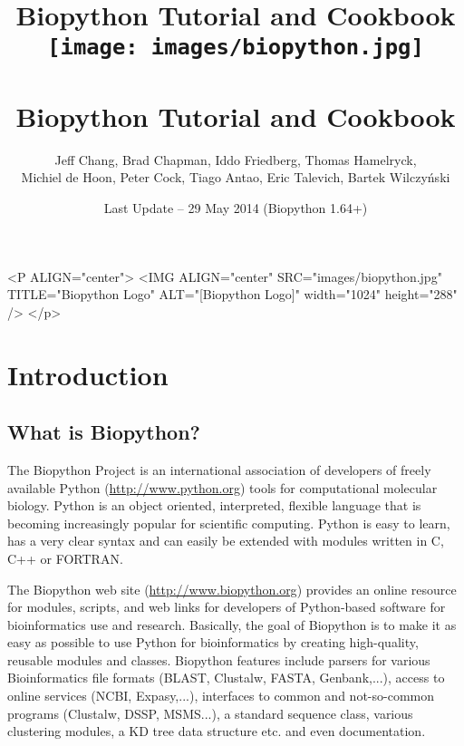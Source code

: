 \documentclass{report}
\begin{document}
\begin{htmlonly}
\title{Biopython Tutorial and Cookbook}
\end{htmlonly}
\begin{latexonly}
\title{
\texttt{[image: images/biopython.jpg]}\\
~\\
Biopython Tutorial and Cookbook}
\end{latexonly}

\author{Jeff Chang, Brad Chapman, Iddo Friedberg, Thomas Hamelryck, \\
Michiel de Hoon, Peter Cock, Tiago Antao, Eric Talevich, Bartek Wilczy\'{n}ski}
\date{Last Update -- 29 May 2014 (Biopython 1.64+)}

\begin{rawhtml}
<P ALIGN="center">
<IMG ALIGN="center" SRC="images/biopython.jpg" TITLE="Biopython Logo" ALT="[Biopython Logo]" width="1024" height="288" />
</p>
\end{rawhtml}

\maketitle
\tableofcontents

\chapter{Introduction}
\label{chapter:introduction}

\section{What is Biopython?}

The Biopython Project is an international association of developers of freely available Python (\url{http://www.python.org}) tools for computational molecular biology. Python is an object oriented, interpreted, flexible language that is becoming increasingly popular for scientific computing. Python is easy to learn, has a very clear syntax and can easily be extended with modules written in C, C++ or FORTRAN.

The Biopython web site (\url{http://www.biopython.org}) provides
an online resource for modules, scripts, and web links for developers
of Python-based software for bioinformatics use and research. Basically,
the goal of Biopython is to make it as easy as possible to use Python
for bioinformatics by creating high-quality, reusable modules and
classes. Biopython features include parsers for various Bioinformatics
file formats (BLAST, Clustalw, FASTA, Genbank,...), access to online
services (NCBI, Expasy,...), interfaces to common and not-so-common
programs (Clustalw, DSSP, MSMS...), a standard sequence class, various
clustering modules, a KD tree data structure etc. and even documentation. 
\end{document}
